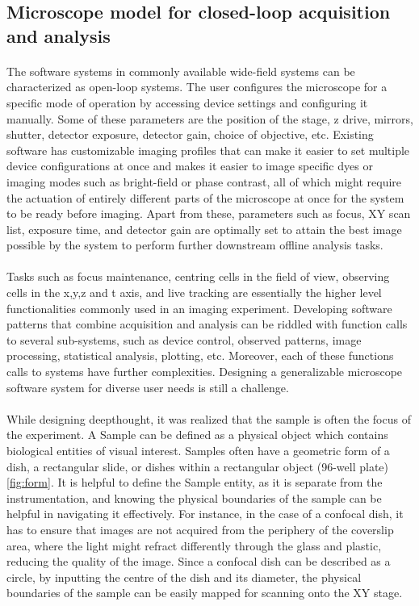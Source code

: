 \subsection{Microscope model for closed-loop acquisition and analysis}
\paragraph*{}The software systems in commonly available wide-field systems can be characterized as open-loop systems. The user configures the microscope for a specific mode of operation by accessing device settings and configuring it manually. Some of these parameters are the position of the stage, z drive, mirrors, shutter, detector exposure, detector gain, choice of objective, etc. Existing software has customizable imaging profiles that can make it easier to set multiple device configurations at once and makes it easier to image specific dyes or imaging modes such as bright-field or phase contrast, all of which might require the actuation of entirely different parts of the microscope at once for the system to be ready before imaging. Apart from these, parameters such as focus, XY scan list, exposure time, and detector gain are optimally set to attain the best image possible by the system to perform further downstream offline analysis tasks. 

\paragraph*{} Tasks such as focus maintenance, centring cells in the field of view, observing cells in the x,y,z and t axis, and live tracking are essentially the higher level functionalities commonly used in an imaging experiment. Developing software patterns that combine acquisition and analysis can be riddled with function calls to several sub-systems, such as device control, observed patterns, image processing, statistical analysis, plotting, etc. Moreover, each of these functions calls to systems have further complexities. Designing a generalizable microscope software system for diverse user needs is still a challenge.

\paragraph*{} While designing deepthought, it was realized that the sample is often the focus of the experiment. A Sample can be defined as a physical object which contains biological entities of visual interest. Samples often have a geometric form of a dish, a rectangular slide, or dishes within a rectangular object (96-well plate) \ref{fig:form}. It is helpful to define the Sample entity, as it is separate from the instrumentation, and knowing the physical boundaries of the sample can be helpful in navigating it effectively. For instance, in the case of a confocal dish, it has to ensure that images are not acquired from the periphery of the coverslip area, where the light might refract differently through the glass and plastic, reducing the quality of the image. Since a confocal dish can be described as a circle, by inputting the centre of the dish and its diameter, the physical boundaries of the sample can be easily mapped for scanning onto the XY stage.


